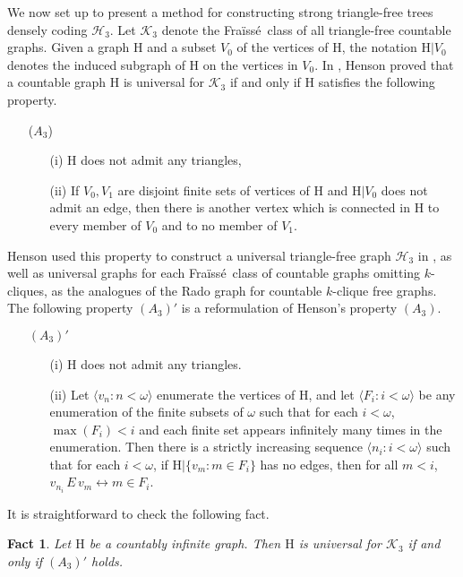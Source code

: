 \documentclass{amsart}
\newtheorem{fact}[thm]{Fact}
\theoremstyle{remark}
\theoremstyle{definition}
\theoremstyle{remark}
\newcommand{\om}{\omega}
\newcommand{\HH}{\mathrm{H}}
\newcommand{\lgl}{\langle}
\newcommand{\rgl}{\rangle}
\newcommand{\Fraisse}{Fra{\"{i}}ss{\'{e}}}
\begin{document}
We now set  up to present  a  method for constructing strong triangle-free trees densely coding $\mathcal{H}_3$.
Let  $\mathcal{K}_3$ denote the \Fraisse\ class of all triangle-free  countable graphs.
Given a graph $\HH$ and a subset $V_0$ of the vertices of $\HH$,
the notation $\HH|V_0$ denotes the induced subgraph  of $\HH$ on the vertices in $V_0$.
In  \cite{Henson71},
Henson proved that a countable graph $\HH$ is universal for  $\mathcal{K}_3$ if and only if $\HH$ satisfies the following property.
\begin{enumerate}
\item[($A_3$)]
\begin{enumerate}
\item[(i)]
$\HH$ does not admit any triangles,
\item[(ii)]
If $V_0,V_1$ are disjoint finite sets of vertices of $\HH$ and $\HH|V_0$ does not admit an edge,
then there is another vertex which is connected in $\HH$ to every member of $V_0$ and to no member of $V_1$.
\end{enumerate}
\end{enumerate}


Henson used this property to construct a universal triangle-free graph $\mathcal{H}_3$ in \cite{Henson71}, as well as universal graphs for each \Fraisse\ class of countable graphs omitting $k$-cliques,
 as the analogues of the Rado graph for countable $k$-clique free graphs.
The following property $(A_3)'$ is a reformulation of
Henson's property $(A_3)$.


\begin{enumerate}
\item[$(A_3)'$]
\begin{enumerate}
\item[(i)]
$\HH$ does not admit any triangles.
\item[(ii)]
Let $\lgl v_n:n<\om\rgl$ enumerate the vertices of $\HH$, and
let $\lgl F_i:i<\om\rgl$ be any enumeration of the finite subsets of $\om$ such that for each $i<\om$, $\max(F_i)<i$ and each finite set  appears  infinitely many times in the enumeration.
Then there is a strictly increasing sequence $\lgl n_i: i<\om\rgl$
such that for each $i<\om$, if  $\HH|\{v_m:m\in F_i\}$
has no edges,
then  for all $m<i$, $v_{n_i} \, E\, v_m\longleftrightarrow m\in F_i$.
\end{enumerate}
\end{enumerate}

It is straightforward to check the following fact.


\begin{fact}\label{fact.A_3'}
Let $\HH$ be a  countably infinite graph. Then
$\HH$
is universal for $\mathcal{K}_3$ if and only if
$(A_3)'$ holds.
\end{fact}
\end{document}
